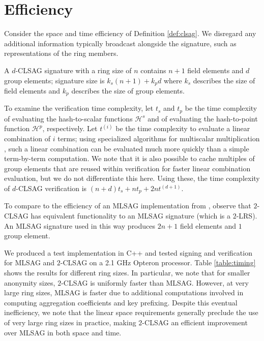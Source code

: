 \documentclass{llncs}
\begin{document}
\section{Efficiency}\label{sec:efficiency}
Consider the space and time efficiency of Definition \ref{def:clsag}. We disregard any additional information typically broadcast alongside the signature, such as representations of the ring members.

A $d$-CLSAG signature with a ring size of $n$ contains $n+1$ field elements and $d$ group elements; signature size is $k_s(n+1) + k_p d$ where $k_s$ describes the size of field elements and $k_p$ describes the size of group elements.

To examine the verification time complexity, let $t_s$ and $t_p$ be the time complexity of evaluating the hash-to-scalar functions $\mathcal{H}^s$ and of evaluating the hash-to-point function $\mathcal{H}^p$, respectively. Let $t^{(i)}$ be the time complexity to evaluate a linear combination of $i$ terms; using specialized algorithms for multiscalar multiplication \cite{straus1964addition,pippenger1980evaluation}, such a linear combination can be evaluated much more quickly than a simple term-by-term computation. We note that it is also possible to cache multiples of group elements that are reused within verification for faster linear combination evaluation, but we do not differentiate this here. Using these, the time complexity of $d$-CLSAG verification is $(n+d)t_s + nt_p + 2nt^{(d+1)}$.

To compare to the efficiency of an MLSAG implementation from \cite{noether2016ring}, observe that $2$-CLSAG has equivalent functionality to an MLSAG signature (which is a $2$-LRS). An MLSAG signature used in this way produces $2n+1$ field elements and $1$ group element.

We produced a test implementation in C++ and tested signing and verification for MLSAG and $2$-CLSAG on a 2.1 GHz Opteron processor. Table \ref{table:timing} shows the results for different ring sizes. In particular, we note that for smaller anonymity sizes, $2$-CLSAG is uniformly faster than MLSAG. However, at very large ring sizes, MLSAG is faster due to additional computations involved in computing aggregation coefficients and key prefixing. Despite this eventual inefficiency, we note that the linear space requirements generally preclude the use of very large ring sizes in practice, making $2$-CLSAG an efficient improvement over MLSAG in both space and time.
\end{document}

